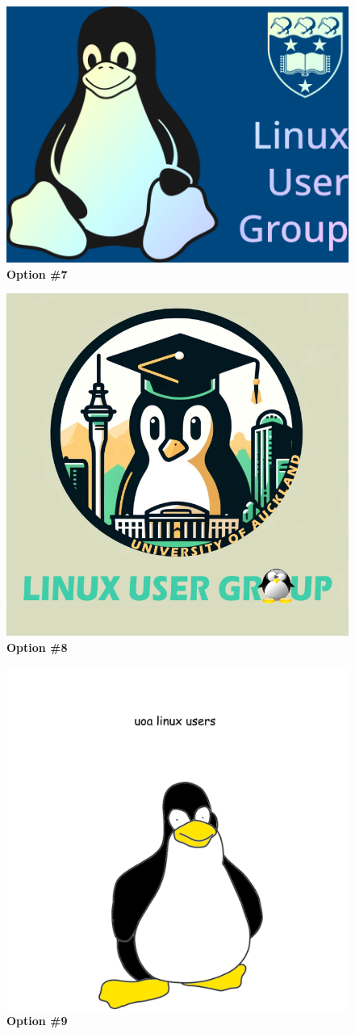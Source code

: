 \documentclass[11pt,fleqn]{article}
\begin{document}
\begin{figure}
  \centering
  \includegraphics[width=0.56\linewidth]{res/7-lug-logo-blue.png}
  \caption*{\Large{\textbf{Option \#7}}}
\end{figure}

\begin{figure}
  \centering
  \includegraphics[width=0.56\linewidth]{res/8.png}
  \caption*{\Large{\textbf{Option \#8}}}
\end{figure}

\begin{figure}
  \centering
  \includegraphics[width=0.56\linewidth]{res/9.png}
  \caption*{\Large{\textbf{Option \#9}}}
\end{figure}
\end{document}
